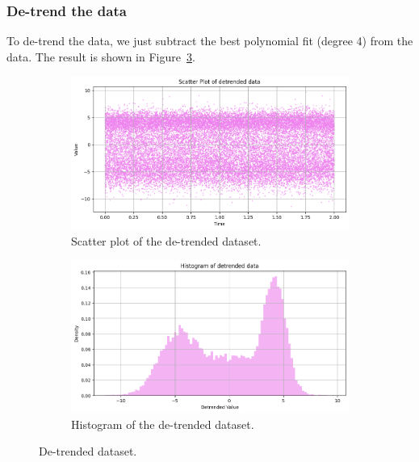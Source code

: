 \documentclass[a4paper]{article}
\begin{document}
\subsubsection*{De-trend the data}

To de-trend the data, we just subtract the best polynomial fit (degree 4) from the data. The result is shown in Figure~\ref{fig:detrended}.

\begin{figure}[htbp]
  \centering
  \begin{subfigure}[t]{0.4\textwidth}
    \centering
    \includegraphics[width=\textwidth]{images/detrended_scatter.png}
    \caption{
      Scatter plot of the de-trended dataset.
    }\label{fig:detrended-scatter}
  \end{subfigure}
  \hfill
  \begin{subfigure}[t]{0.4\textwidth}
    \centering
    \includegraphics[width=\textwidth]{images/detrended_dist.png}
    \caption{
      Histogram of the de-trended dataset.
    }\label{fig:detrended-hist}
  \end{subfigure}
  \caption{
    De-trended dataset.
  }\label{fig:detrended}
\end{figure}
\end{document}
